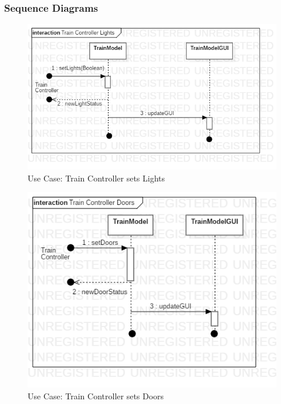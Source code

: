 \documentclass{article}
\begin{document}
    \subsubsection{Sequence Diagrams}
    \begin{figure}[H]
        \centering
        \includegraphics[width=\textwidth]{./TrainModel/ControlLights.png}
        \caption{Use Case: Train Controller sets Lights}
        \label{fig:Train Model Control Lights}
    \end{figure}
    \begin{figure}[H]
        \centering
        \includegraphics[width=\textwidth]{./TrainModel/Doors.png}
        \caption{Use Case: Train Controller sets Doors}
        \label{fig:Train Model Control Doors}
    \end{figure}
\end{document}
